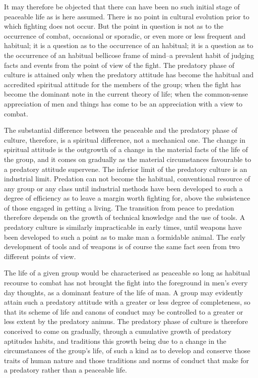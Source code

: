 \documentclass[12pt]{report}
\begin{document}
It may therefore be objected that there can have been no such initial
stage of peaceable life as is here assumed. There is no point in
cultural evolution prior to which fighting does not occur. But the
point in question is not as to the occurrence of combat, occasional or
sporadic, or even more or less frequent and habitual; it is a question
as to the occurrence of an habitual; it is a question as to the
occurrence of an habitual bellicose frame of mind--a prevalent habit
of judging facts and events from the point of view of the fight. The
predatory phase of culture is attained only when the predatory attitude
has become the habitual and accredited spiritual attitude for the
members of the group; when the fight has become the dominant note in the
current theory of life; when the common-sense appreciation of men and
things has come to be an appreciation with a view to combat.

The substantial difference between the peaceable and the predatory phase
of culture, therefore, is a spiritual difference, not a mechanical one.
The change in spiritual attitude is the outgrowth of a change in the
material facts of the life of the group, and it comes on gradually as
the material circumstances favourable to a predatory attitude supervene.
The inferior limit of the predatory culture is an industrial limit.
Predation can not become the habitual, conventional resource of any
group or any class until industrial methods have been developed to such
a degree of efficiency as to leave a margin worth fighting for, above
the subsistence of those engaged in getting a living. The transition
from peace to predation therefore depends on the growth of technical
knowledge and the use of tools. A predatory culture is similarly
impracticable in early times, until weapons have been developed to such
a point as to make man a formidable animal. The early development of
tools and of weapons is of course the same fact seen from two different
points of view.

The life of a given group would be characterised as peaceable so long
as habitual recourse to combat has not brought the fight into the
foreground in men's every day thoughts, as a dominant feature of the
life of man. A group may evidently attain such a predatory attitude with
a greater or less degree of completeness, so that its scheme of life and
canons of conduct may be controlled to a greater or less extent by the
predatory animus. The predatory phase of culture is therefore conceived
to come on gradually, through a cumulative growth of predatory aptitudes
habits, and traditions this growth being due to a change in the
circumstances of the group's life, of such a kind as to develop and
conserve those traits of human nature and those traditions and norms of
conduct that make for a predatory rather than a peaceable life.
\end{document}
